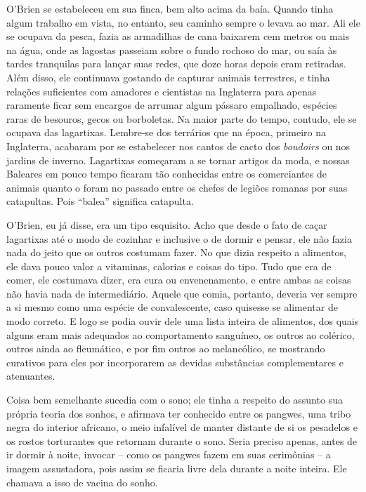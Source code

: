O'Brien se estabeleceu em sua finca, bem alto acima da baía. Quando
tinha algum trabalho em vista, no entanto, seu caminho sempre o levava
ao mar. Ali ele se ocupava da pesca, fazia as armadilhas de cana
baixarem cem metros ou mais na água, onde as lagostas passeiam sobre o
fundo rochoso do mar, ou saía às tardes tranquilas para lançar suas
redes, que doze horas depois eram retiradas. Além disso, ele continuava
gostando de capturar animais terrestres, e tinha relações suficientes
com amadores e cientistas na Inglaterra para apenas raramente ficar sem
encargos de arrumar algum pássaro empalhado, espécies raras de besouros,
gecos ou borboletas. Na maior parte do tempo, contudo, ele se ocupava
das lagartixas. Lembre-se dos terrários que na época, primeiro na
Inglaterra, acabaram por se estabelecer nos cantos de cacto dos
\emph{boudoirs} ou nos jardins de inverno. Lagartixas começaram a se
tornar artigos da moda, e nossas Baleares em pouco tempo ficaram tão
conhecidas entre os comerciantes de animais quanto o foram no passado
entre os chefes de legiões romanas por suas catapultas. Pois ``balea''
significa catapulta.

O'Brien, eu já disse, era um tipo esquisito. Acho que desde o fato de
caçar lagartixas até o modo de cozinhar e inclusive o de dormir e
pensar, ele não fazia nada do jeito que os outros costumam fazer. No que
dizia respeito a alimentos, ele dava pouco valor a vitaminas, calorias e
coisas do tipo. Tudo que era de comer, ele costumava dizer, era cura ou
envenenamento, e entre ambas as coisas não havia nada de intermediário.
Aquele que comia, portanto, deveria ver sempre a si mesmo como uma
espécie de convalescente, caso quisesse se alimentar de modo correto. E
logo se podia ouvir dele uma lista inteira de alimentos, dos quais
alguns eram mais adequados ao comportamento sanguíneo, os outros ao
colérico, outros ainda ao fleumático, e por fim outros ao melancólico,
se mostrando curativos para eles por incorporarem as devidas substâncias
complementares e atenuantes.

Coisa bem semelhante sucedia com o sono; ele tinha a respeito do assunto
sua própria teoria dos sonhos, e afirmava ter conhecido entre os
pangwes, uma tribo negra do interior africano, o meio infalível de
manter distante de si os pesadelos e os rostos torturantes que retornam
durante o sono. Seria preciso apenas, antes de ir dormir à noite,
invocar -- como os pangwes fazem em suas cerimônias -- a imagem
assustadora, pois assim se ficaria livre dela durante a noite inteira.
Ele chamava a isso de vacina do sonho.


